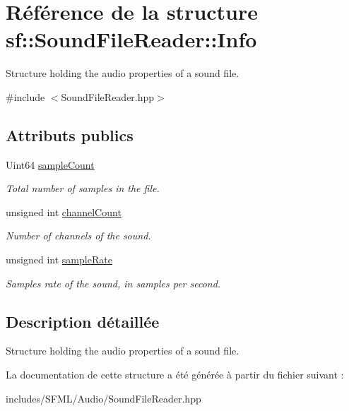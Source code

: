 \hypertarget{structsf_1_1SoundFileReader_1_1Info}{}\section{Référence de la structure sf\+:\+:Sound\+File\+Reader\+:\+:Info}
\label{structsf_1_1SoundFileReader_1_1Info}


Structure holding the audio properties of a sound file.  




{\ttfamily \#include $<$Sound\+File\+Reader.\+hpp$>$}

\subsection*{Attributs publics}
\begin{DoxyCompactItemize}
\item 
\mbox{\label{structsf_1_1SoundFileReader_1_1Info_a74b40b4693d7000571484736d1367167}} 
Uint64 \hyperlink{structsf_1_1SoundFileReader_1_1Info_a74b40b4693d7000571484736d1367167}{sample\+Count}
\begin{DoxyCompactList}\small\item\em Total number of samples in the file. \end{DoxyCompactList}\item 
\mbox{\label{structsf_1_1SoundFileReader_1_1Info_ac748bb30768d1a3caf329e95d31d6d2a}} 
unsigned int \hyperlink{structsf_1_1SoundFileReader_1_1Info_ac748bb30768d1a3caf329e95d31d6d2a}{channel\+Count}
\begin{DoxyCompactList}\small\item\em Number of channels of the sound. \end{DoxyCompactList}\item 
\mbox{\label{structsf_1_1SoundFileReader_1_1Info_a06ef71c19e7de190b294ae02c361f752}} 
unsigned int \hyperlink{structsf_1_1SoundFileReader_1_1Info_a06ef71c19e7de190b294ae02c361f752}{sample\+Rate}
\begin{DoxyCompactList}\small\item\em Samples rate of the sound, in samples per second. \end{DoxyCompactList}\end{DoxyCompactItemize}


\subsection{Description détaillée}
Structure holding the audio properties of a sound file. 

La documentation de cette structure a été générée à partir du fichier suivant \+:\begin{DoxyCompactItemize}
\item 
includes/\+S\+F\+M\+L/\+Audio/Sound\+File\+Reader.\+hpp\end{DoxyCompactItemize}
